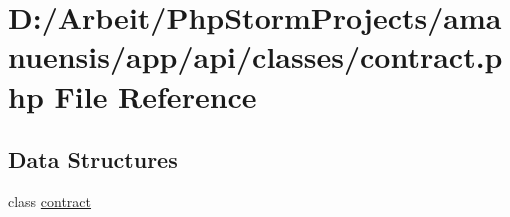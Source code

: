 \hypertarget{contract_8php}{}\section{D\+:/\+Arbeit/\+Php\+Storm\+Projects/amanuensis/app/api/classes/contract.php File Reference}
\label{contract_8php}
\subsection*{Data Structures}
\begin{DoxyCompactItemize}
\item 
class \hyperlink{classcontract}{contract}
\end{DoxyCompactItemize}
